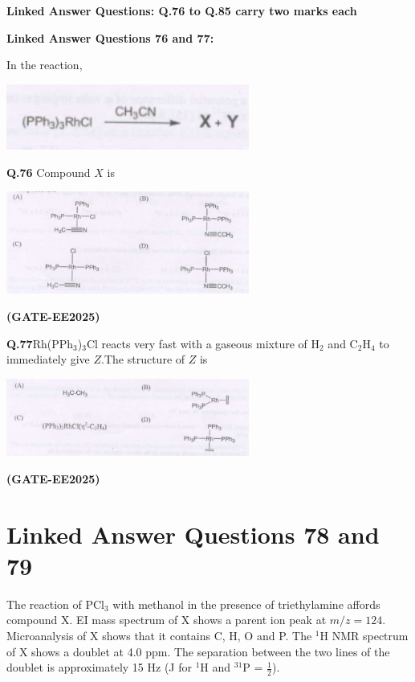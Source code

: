 \documentclass[12pt]{article}
\begin{document}
\begin{enumerate}
\textbf{Linked Answer Questions: Q.76 to Q.85 carry two marks each}

\textbf{Linked Answer Questions 76 and 77:}

In the reaction,

\begin{center}
\includegraphics[width=0.6\textwidth]{figs/q76 1.png}
\end{center}

\textbf{Q.76} Compound $X$ is

\begin{center}
\includegraphics[width=0.6\textwidth]{figs/q76_2.png}
\end{center}   \textbf{(GATE-EE2025)}


\textbf{Q.77}Rh(PPh$_3$)$_3$Cl reacts very fast with a gaseous mixture of H$_2$ and C$_2$H$_4$ to immediately give $Z$.The structure of $Z$ is

\begin{center}
\includegraphics[width=0.6\textwidth]{figs/q77.png}
\end{center}   \textbf{(GATE-EE2025)}


\section*{Linked Answer Questions 78 and 79}

The reaction of PCl$_3$ with methanol in the presence of triethylamine affords compound X. EI mass spectrum of X shows a parent ion peak at $m/z = 124$. Microanalysis of X shows that it contains C, H, O and P. The $^1$H NMR spectrum of X shows a doublet at 4.0 ppm. The separation between the two lines of the doublet is approximately 15 Hz (J for $^1$H and $^{31}$P = $\tfrac{1}{2}$).


\end{enumerate}
\end{document}
